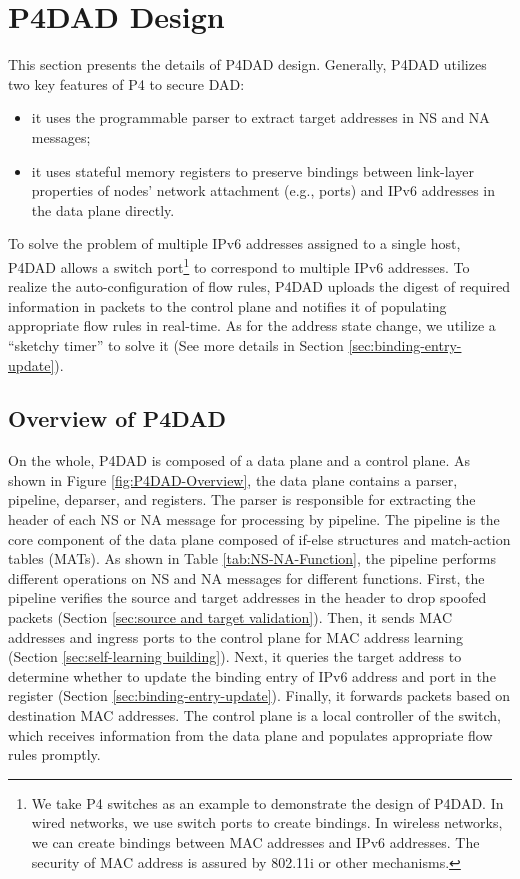 \documentclass[a4paper,fleqn]{cas-dc}
\begin{document}
\section{P4DAD Design}\label{sec:p4dad design}
    This section presents the details of P4DAD design. Generally, P4DAD utilizes two key features of P4 to secure DAD:
    \begin{itemize}
        \item it uses the programmable parser to extract target addresses in NS and NA messages;
        \item it uses stateful memory registers to preserve bindings between link-layer properties of nodes' network attachment (e.g., ports) and IPv6 addresses in the data plane directly.
    \end{itemize}

    To solve the problem of multiple IPv6 addresses assigned to a single host, P4DAD allows a switch port\footnote{We take P4 switches as an example to demonstrate the design of P4DAD. In wired networks, we use switch ports to create bindings. In wireless networks, we can create bindings between MAC addresses and IPv6 addresses. The security of MAC address is assured by 802.11i or other mechanisms.} to correspond to multiple IPv6 addresses. To realize the auto-configuration of flow rules, P4DAD uploads the digest of required information in packets to the control plane and notifies it of populating appropriate flow rules in real-time. As for the address state change, we utilize a ``sketchy timer'' to solve it (See more details in Section \ref{sec:binding-entry-update}).

    \subsection{Overview of P4DAD}
        On the whole, P4DAD is composed of a data plane and a control plane. As shown in Figure \ref{fig:P4DAD-Overview}, the data plane contains a parser, pipeline, deparser, and registers. The parser is responsible for extracting the header of each NS or NA message for processing by pipeline. The pipeline is the core component of the data plane composed of if-else structures and match-action tables (MATs). As shown in Table \ref{tab:NS-NA-Function}, the pipeline performs different operations on NS and NA messages for different functions. First, the pipeline verifies the source and target addresses in the header to drop spoofed packets (Section \ref{sec:source and target validation}). Then, it sends MAC addresses and ingress ports to the control plane for MAC address learning (Section \ref{sec:self-learning building}). Next, it queries the target address to determine whether to update the binding entry of IPv6 address and port in the register (Section \ref{sec:binding-entry-update}). Finally, it forwards packets based on destination MAC addresses.
        The control plane is a local controller of the switch, which receives information from the data plane and populates appropriate flow rules promptly.
\end{document}
